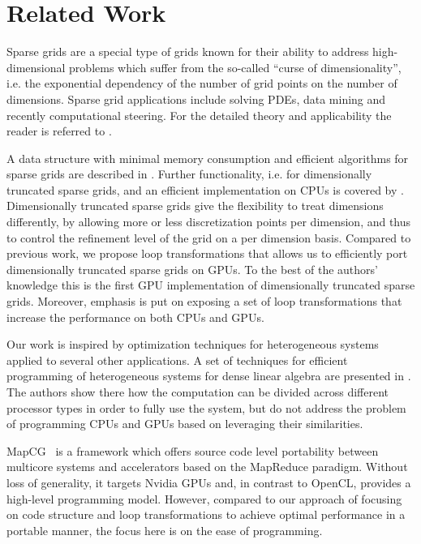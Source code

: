 \section{Related Work}
\label{sec:related_work}
Sparse grids are a special type of grids known for their ability to address
high-dimensional problems which suffer from the so-called ``curse of
dimensionality'', i.e. the exponential dependency of the number of grid points
on the number of dimensions. Sparse grid applications include solving PDEs, data mining
and recently computational steering. For the detailed theory and applicability the 
reader is referred to \cite{CambridgeJournals:227245}.

A data structure with minimal memory consumption and efficient
algorithms for sparse grids are described in 
\cite{Murarasu:2011:CDS:1941553.1941559}. Further functionality, i.e. for dimensionally
truncated sparse grids, and an efficient implementation on CPUs is covered by \cite{murarasu12fastsg:}.
Dimensionally truncated sparse grids give the flexibility to treat dimensions differently, 
by allowing more or less discretization points per dimension, and thus to control the refinement level of the grid
on a per dimension basis. Compared to previous work, we propose loop transformations that allows us to 
efficiently port dimensionally truncated sparse grids on GPUs. To the best of the authors' knowledge this is the first
GPU implementation of dimensionally truncated sparse grids. Moreover, emphasis is put on exposing a set 
of loop transformations that increase the performance on both CPUs and GPUs.

Our work is inspired by optimization techniques for heterogeneous systems
applied to several other applications. A set of techniques for
efficient programming of heterogeneous systems for dense linear algebra
are presented in \cite{Tomov:2010:TDL:1805333.1805388}. The authors show there how the computation 
can be divided across different processor types in order to fully use the system, but do not address 
the problem of programming CPUs and GPUs based on leveraging their similarities.

MapCG~\cite{mapcg} is a framework which offers source code level portability
between multicore systems and accelerators based on the MapReduce paradigm.
Without loss of generality, it targets Nvidia GPUs and, in contrast to OpenCL,
provides a high-level programming model. However, compared to our approach of
focusing on code structure and loop transformations to achieve optimal
performance in a portable manner, the focus here is on the ease of programming.


